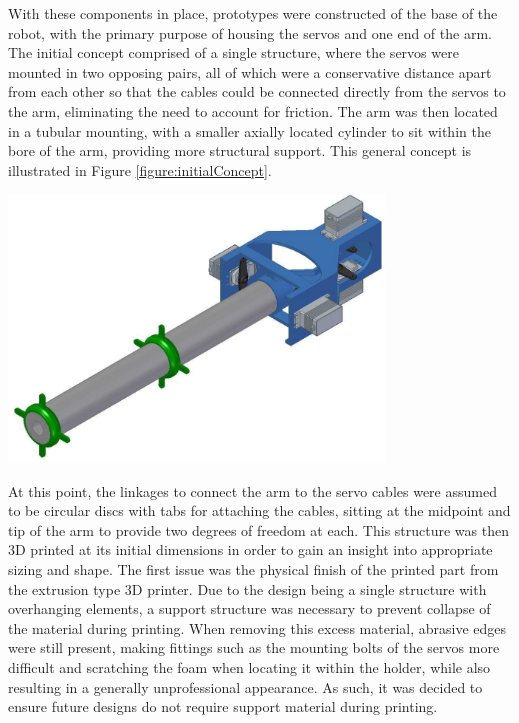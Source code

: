 \documentclass[11pt]{article}
\begin{document}
With these components in place, prototypes were constructed of the base of the robot, with the primary purpose of housing the servos and one end of the arm. The initial concept comprised of a single structure, where the servos were mounted in two opposing pairs, all of which were a conservative distance apart from each other so that the cables could be connected directly from the servos to the arm, eliminating the need to account for friction. The arm was then located in a tubular mounting, with a smaller axially located cylinder to sit within the bore of the arm, providing more structural support. This general concept is illustrated in Figure \ref{figure:initialConcept}.

\begin{center}
\includegraphics[width=0.75\textwidth]{images/initialConcept.png}
\label{figure:initialConcept}
\end{center}

At this point, the linkages to connect the arm to the servo cables were assumed to be circular discs with tabs for attaching the cables, sitting at the midpoint and tip of the arm to provide two degrees of freedom at each. This structure was then 3D printed at its initial dimensions in order to gain an insight into appropriate sizing and shape. The first issue was the physical finish of the printed part from the extrusion type 3D printer. Due to the design being a single structure with overhanging elements, a support structure was necessary to prevent collapse of the material during printing. When removing this excess material, abrasive edges were still present, making fittings such as the mounting bolts of the servos more difficult and scratching the foam when locating it within the holder, while also resulting in a generally unprofessional appearance. As such, it was decided to ensure future designs do not require support material during printing. 
\end{document}

